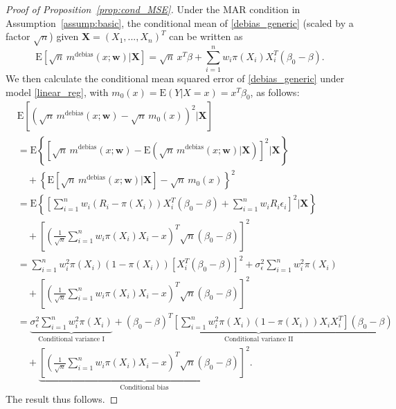 \documentclass[ejsv2,noshowframe]{imsart}
\theoremstyle{plain}
\theoremstyle{definition}
\theoremstyle{remark}
\begin{document}
\begin{proof}[Proof of Proposition~\ref{prop:cond_MSE}]
	Under the MAR condition in Assumption~\ref{assump:basic}, the conditional mean of \eqref{debias_generic} (scaled by a factor $\sqrt{n}$) given $\bm{X} = (X_1,...,X_n)^T$ can be written as
	$$\mathrm{E}\left[\sqrt{n}\, m^{\text{debias}}(x;\bm{w}) \big|\bm{X} \right] = \sqrt{n}\,x^T\beta + \sum_{i=1}^n w_i \pi(X_i) X_i^T\left(\beta_0 - \beta\right).$$
	We then calculate the conditional mean squared error of \eqref{debias_generic} under model \eqref{linear_reg}, with $m_0(x)=\mathrm{E}(Y|X=x)=x^T\beta_0$, as follows:
	\begin{align*}
		&\mathrm{E}\left[\left(\sqrt{n}\, m^{\text{debias}}(x;\bm{w}) - \sqrt{n}\, m_0(x) \right)^2 \Big| \bm{X} \right] \\
		&= \mathrm{E}\left\{\left[\sqrt{n} \, m^{\text{debias}}(x;\bm{w}) - \mathrm{E}\left(\sqrt{n}\, m^{\text{debias}}(x;\bm{w})\big|\bm{X} \right)\right]^2 \Big| \bm{X} \right\} \\
		&\quad + \left\{\mathrm{E}\left[\sqrt{n}\, m^{\text{debias}}(x;\bm{w}) \big|\bm{X}\right] -\sqrt{n}\, m_0(x) \right\}^2\\
		&= \mathrm{E}\left\{\left[\sum_{i=1}^n w_i (R_i-\pi(X_i)) X_i^T\left(\beta_0 - \beta\right) + \sum_{i=1}^n w_i R_i\epsilon_i \right]^2 \Bigg|\bm{X} \right\} \\
		&\quad + \left[\left(\frac{1}{\sqrt{n}}\sum_{i=1}^n w_i \pi(X_i) X_i -x \right)^T \sqrt{n}\left(\beta_0 - \beta\right) \right]^2\\
		&= \sum_{i=1}^n w_i^2 \pi(X_i) \left(1-\pi(X_i)\right) \left[X_i^T\left(\beta_0 - \beta\right) \right]^2 + \sigma_{\epsilon}^2 \sum_{i=1}^n w_i^2 \pi(X_i) \\
		&\quad + \left[\left(\frac{1}{\sqrt{n}}\sum_{i=1}^n w_i \pi(X_i) X_i -x \right)^T \sqrt{n}\left(\beta_0 - \beta\right) \right]^2\\
		&= \underbrace{\sigma_{\epsilon}^2\sum_{i=1}^n w_i^2 \pi(X_i)}_{\text{Conditional variance I}} + \underbrace{\left(\beta_0 - \beta\right)^T \left[\sum_{i=1}^n w_i^2\pi(X_i)\left(1-\pi(X_i)\right)X_iX_i^T \right] \left(\beta_0 - \beta\right)}_{\text{Conditional variance II}} \\
		&\quad + \underbrace{\left[\left(\frac{1}{\sqrt{n}}\sum_{i=1}^n w_i \pi(X_i) X_i -x \right)^T \sqrt{n}\left(\beta_0 - \beta\right) \right]^2}_{\text{Conditional bias}}.
	\end{align*}
	The result thus follows.
\end{proof}
\end{document}
